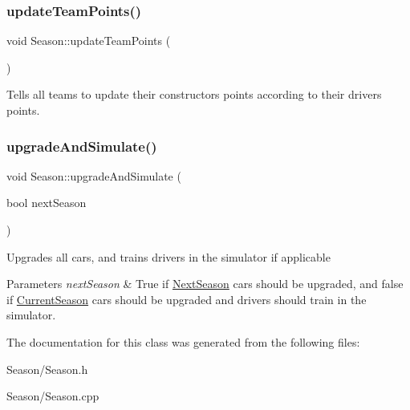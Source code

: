 \subsubsection{\texorpdfstring{update\+Team\+Points()}{updateTeamPoints()}}
{\footnotesize\ttfamily void Season\+::update\+Team\+Points (\begin{DoxyParamCaption}{ }\end{DoxyParamCaption})\hspace{0.3cm}{\ttfamily [private]}}

Tells all teams to update their constructors\textquotesingle{} points according to their drivers\textquotesingle{} points. \mbox{\label{classSeason_a4eecb09cc35da82444657a9095789dca}} 
\subsubsection{\texorpdfstring{upgrade\+And\+Simulate()}{upgradeAndSimulate()}}
{\footnotesize\ttfamily void Season\+::upgrade\+And\+Simulate (\begin{DoxyParamCaption}\item[{bool}]{next\+Season }\end{DoxyParamCaption})\hspace{0.3cm}{\ttfamily [private]}}

Upgrades all cars, and trains drivers in the simulator if applicable 
\begin{DoxyParams}{Parameters}
{\em next\+Season} & True if \hyperlink{classNextSeason}{Next\+Season} cars should be upgraded, and false if \hyperlink{classCurrentSeason}{Current\+Season} cars should be upgraded and drivers should train in the simulator. \\
\hline
\end{DoxyParams}


The documentation for this class was generated from the following files\+:\begin{DoxyCompactItemize}
\item 
Season/Season.\+h\item 
Season/Season.\+cpp\end{DoxyCompactItemize}
